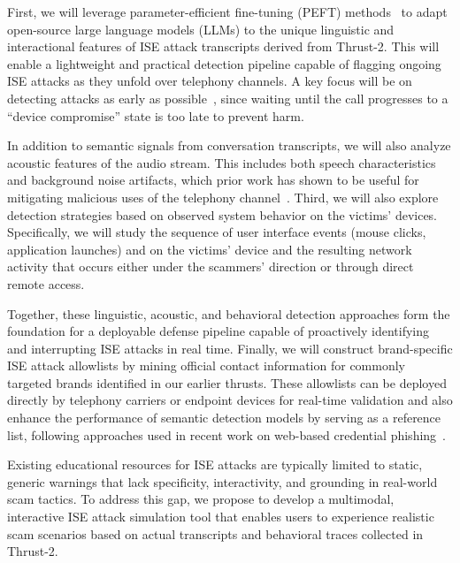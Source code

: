 First, we will leverage parameter-efficient fine-tuning (PEFT) methods~\cite{HuSWALWWC22,DettmersPHZ23,XuXG0CZC0024} to adapt open-source large language models (LLMs) to the unique linguistic and interactional features of ISE attack transcripts derived from Thrust-2. This will enable a lightweight and practical detection pipeline capable of flagging ongoing ISE attacks as they unfold over telephony channels. A key focus will be on detecting attacks as early as possible~\cite{LiuW18,HartvigsenSKR19,RingelCFER24}, since waiting until the call progresses to a ``device compromise'' state is too late to prevent harm.

In addition to semantic signals from conversation transcripts, we will also analyze acoustic features of the audio stream. This includes both speech characteristics and background noise artifacts, which prior work has shown to be useful for mitigating malicious uses of the telephony channel~\cite{BalasubramaniyanPAHT10,KotropoulosS14,PrasadBMR20,KritsiolisK24}. Third, we will also explore detection strategies based on observed system behavior on the victims' devices. Specifically, we will study the sequence of user interface events (\eg mouse clicks, application launches) and on the victims' device and the resulting network activity that occurs either under the scammers' direction or through direct remote access.

Together, these linguistic, acoustic, and behavioral detection approaches form the foundation for a deployable defense pipeline capable of proactively identifying and interrupting ISE attacks in real time. Finally, we will construct brand-specific ISE attack allowlists by mining official contact information for commonly targeted brands identified in our earlier thrusts. These allowlists can be deployed directly by telephony carriers or endpoint devices for real-time validation and also enhance the performance of semantic detection models by serving as a reference list, following approaches used in recent work on web-based credential phishing~\cite{LiHDLCOLH24,phishintention,AbdelnabiKF20}.




Existing educational resources for ISE attacks are typically limited to static, generic warnings that lack specificity, interactivity, and grounding in real-world scam tactics. To address this gap, we propose to develop a multimodal, interactive ISE attack simulation tool that enables users to experience realistic scam scenarios based on actual transcripts and behavioral traces collected in Thrust-2.

